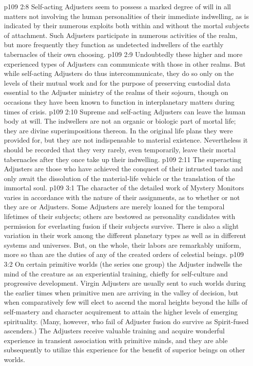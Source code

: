 \pc \vs p109 2:8 Self\hyp{}acting Adjusters seem to possess a marked degree of will in all matters not involving the human personalities of their immediate indwelling, as is indicated by their numerous exploits both within and without the mortal subjects of attachment. Such Adjusters participate in numerous activities of the realm, but more frequently they function as undetected indwellers of the earthly tabernacles of their own choosing.
\vs p109 2:9 Undoubtedly these higher and more experienced types of Adjusters can communicate with those in other realms. But while self\hyp{}acting Adjusters do thus intercommunicate, they do so only on the levels of their mutual work and for the purpose of preserving custodial data essential to the Adjuster ministry of the realms of their sojourn, though on occasions they have been known to function in interplanetary matters during times of crisis.
\vs p109 2:10 Supreme and self\hyp{}acting Adjusters can leave the human body at will. The indwellers are not an organic or biologic part of mortal life; they are divine superimpositions thereon. In the original life plans they were provided for, but they are not indispensable to material existence. Nevertheless it should be recorded that they very rarely, even temporarily, leave their mortal tabernacles after they once take up their indwelling.
\vs p109 2:11 The superacting Adjusters are those who have achieved the conquest of their intrusted tasks and only await the dissolution of the material\hyp{}life vehicle or the translation of the immortal soul.
\vs p109 3:1 The character of the detailed work of Mystery Monitors varies in accordance with the nature of their assignments, as to whether or not they are  or  Adjusters. Some Adjusters are merely loaned for the temporal lifetimes of their subjects; others are bestowed as personality candidates with permission for everlasting fusion if their subjects survive. There is also a slight variation in their work among the different planetary types as well as in different systems and universes. But, on the whole, their labors are remarkably uniform, more so than are the duties of any of the created orders of celestial beings.
\vs p109 3:2 On certain primitive worlds (the series one group) the Adjuster indwells the mind of the creature as an experiential training, chiefly for self\hyp{}culture and progressive development. Virgin Adjusters are usually sent to such worlds during the earlier times when primitive men are arriving in the valley of decision, but when comparatively few will elect to ascend the moral heights beyond the hills of self\hyp{}mastery and character acquirement to attain the higher levels of emerging spirituality. (Many, however, who fail of Adjuster fusion do survive as Spirit\hyp{}fused ascenders.) The Adjusters receive valuable training and acquire wonderful experience in transient association with primitive minds, and they are able subsequently to utilize this experience for the benefit of superior beings on other worlds. 
